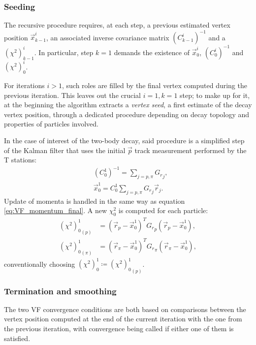\subsubsection{Seeding}
\label{sec:3:seeding}

The recursive procedure requires, at each step, a previous estimated vertex position $\vec{x}_{k-1}^i$, an associated inverse covariance matrix ${(C_{k-1}^i)}^{-1}$ and a ${(\chi^2)}_{k-1}^i$. In particular, step $k=1$ demands the existence of $\vec{x}_0^i$, ${(C_{0}^i)}^{-1}$ and ${(\chi^2)}_{0}^i$.

For iterations $i>1$, such roles are filled by the final vertex computed during the previous iteration.
This leaves out the crucial $i=1,k=1$ step;
to make up for it, at the beginning the algorithm extracts a \textit{vertex seed}, a first estimate of the decay vertex position, through a dedicated procedure depending on decay topology and properties of particles involved.

In the case of interest of the \lambdadecay two-body decay, said procedure is a simplified step of the Kalman filter that uses the initial $\vec{p}$ track measurement performed by the T stations:
\begin{subequations}
\begin{align}
	&{(C_{0}^{1})}^{-1} = \sum_{j=p,\pi} {G_r}_j, \\
	&\vec{x}_0^1 = C_0^1 \sum_{j=p,\pi} {G_r}_j \vec{r}_j.
\end{align}
\end{subequations}
Update of momenta is handled in the same way as equation \eqref{eq:VF_momentum_final}.
A new $\chi^2_0$ is computed for each particle:
\begin{subequations}
\begin{align}
	{{(\chi^2)}_0^1}_{(p)} &= 
	{\left(\vec{r}_{p} - \vec{x}_0^1\right)}^T  {G_r}_p \left(\vec{r}_{p} - \vec{x}_0^1 \right), \\
	{{(\chi^2)}_0^1}_{(\pi)} &= 
	{\left(\vec{r}_{\pi} - \vec{x}_0^1\right)}^T  {G_r}_\pi \left(\vec{r}_{\pi} - \vec{x}_0^1 \right),
\end{align}
\end{subequations}
conventionally choosing ${(\chi^2)}_0^1 \coloneqq {{(\chi^2)}_0^1}_{(p)}$.

\subsubsection{Termination and smoothing}
The two VF convergence conditions are both based on comparisons between the vertex position computed at the end of the current iteration with the one from the previous iteration, with convergence being called if either one of them is satisfied.

